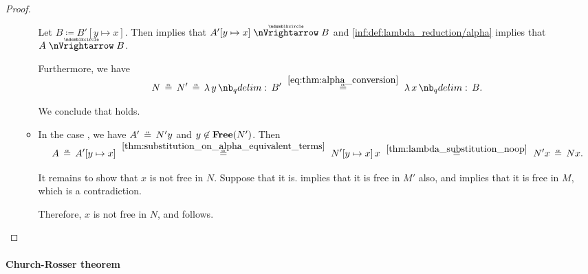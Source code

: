 \begin{proof}
\begin{itemize}
\begin{itemize}
      Let \( B \coloneqq B'[y \mapsto x] \). Then  implies that \( A'[y \mapsto x] \ppred B \) and \ref{inf:def:lambda_reduction/alpha} implies that \( A \ppred B \).

      Furthermore, we have
      \begin{equation*}
        N
        \aequiv
        N'
        \aequiv
        \qabs y B'
        \reloset {\eqref{eq:thm:alpha_conversion}} \aequiv
        \qabs x B.
      \end{equation*}

      We conclude that  holds.

      \item In the case , we have \( A' \aequiv N'y \) and \( y \not\in \op*{Free}(N') \). Then
      \begin{equation*}
        A
        \aequiv
        A'[y \mapsto x]
        \reloset {\ref{thm:substitution_on_alpha_equivalent_terms}} \aequiv
        N'[y \mapsto x] \thinspace x
        \reloset {\ref{thm:lambda_substitution_noop}} =
        N' x
        \aequiv
        N x.
      \end{equation*}

      It remains to show that \( x \) is not free in \( N \). Suppose that it is.  implies that it is free in \( M' \) also, and  implies that it is free in \( M \), which is a contradiction.

      Therefore, \( x \) is not free in \( N \), and  follows.
    \end{itemize}
  \end{itemize}
\end{proof}

\paragraph{Church-Rosser theorem}

